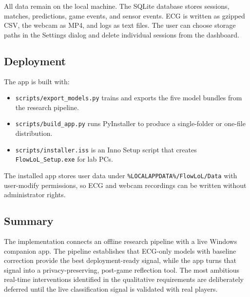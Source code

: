 All data remain on the local machine. The SQLite database stores sessions, matches, predictions, game events, and sensor events. ECG is written as gzipped CSV, the webcam as MP4, and logs as text files. The user can choose storage paths in the Settings dialog and delete individual sessions from the dashboard.

\subsection{Deployment}

The app is built with:

\begin{itemize}
    \item \texttt{scripts/export\_models.py} trains and exports the five model bundles from the research pipeline.
    \item \texttt{scripts/build\_app.py} runs PyInstaller to produce a single-folder or one-file distribution.
    \item \texttt{scripts/installer.iss} is an Inno Setup script that creates \texttt{FlowLoL\_Setup.exe} for lab PCs.
\end{itemize}

The installed app stores user data under \texttt{\%LOCALAPPDATA\%/FlowLoL/Data} with user-modify permissions, so ECG and webcam recordings can be written without administrator rights.

\subsection{Summary}

The implementation connects an offline research pipeline with a live Windows companion app. The pipeline establishes that ECG-only models with baseline correction provide the best deployment-ready signal, while the app turns that signal into a privacy-preserving, post-game reflection tool. The most ambitious real-time interventions identified in the qualitative requirements are deliberately deferred until the live classification signal is validated with real players.
